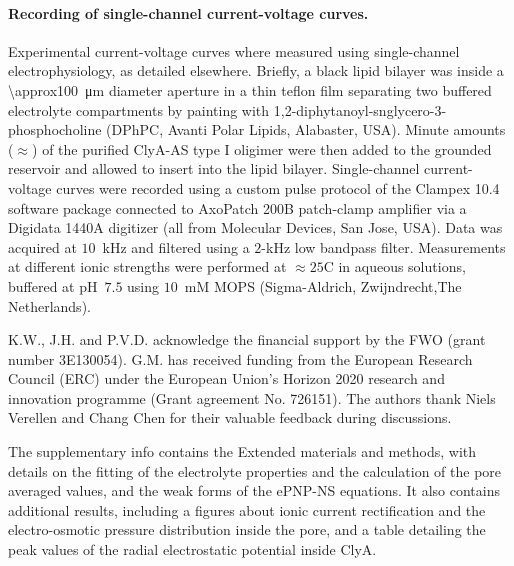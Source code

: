 \documentclass[journal=ancac3,manuscript=article,etalmode=truncate,maxauthors=0,layout=onecolumn]{achemso}
\begin{document}
\paragraph{Recording of single-channel current-voltage curves.}
%
Experimental current-voltage curves where measured using single-channel electrophysiology, as detailed
elsewhere.\cite{Maglia-2010,Soskine-2012,Soskine-2013} Briefly, a black lipid bilayer was inside a
\SI{\approx100}{\um} diameter aperture in a thin teflon film separating two buffered electrolyte compartments
by painting with 1,2-diphytanoyl-snglycero-3-phosphocholine (DPhPC, Avanti Polar Lipids, Alabaster, USA).
Minute amounts ($\approx$) of the purified ClyA-AS type I oligimer were then added to the grounded \cis{}
reservoir and allowed to insert into the lipid bilayer. Single-channel current-voltage curves were recorded
using a custom pulse protocol of the Clampex 10.4 software package connected to AxoPatch 200B patch-clamp
amplifier via a Digidata 1440A digitizer (all from Molecular Devices, San Jose, USA). Data was acquired at
$10$~kHz and filtered using a $2$-kHz low bandpass filter. Measurements at different ionic strengths were
performed at $\approx25$\textdegree C in aqueous  solutions, buffered at pH~$7.5$ using $10$~mM MOPS
(Sigma-Aldrich, Zwijndrecht,The Netherlands).

\begin{acknowledgement}
  K.W., J.H. and P.V.D. acknowledge the financial support by the FWO (grant number 3E130054). G.M. has
  received funding from the European Research Council (ERC) under the European Union's Horizon 2020 research
  and innovation programme (Grant agreement No. 726151). The authors thank Niels Verellen and Chang Chen for
  their valuable feedback during discussions.
\end{acknowledgement}

\begin{suppinfo}
	The supplementary info contains the Extended materials and methods, with details on the fitting of the
	electrolyte properties and the calculation of the pore averaged values, and the weak forms of the ePNP-NS
	equations. It also contains additional results, including a figures about ionic current rectification and
	the electro-osmotic pressure distribution inside the pore, and a table detailing the peak values of the
	radial electrostatic potential inside ClyA.
\end{suppinfo}



%
\end{document}
